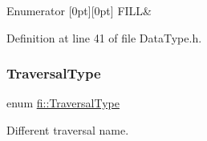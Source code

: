 \begin{DoxyEnumFields}{Enumerator}
[0pt][0pt]{}\mbox{\label{namespacefi_a6808b618c85d179a330ca388162215bdae8225b11842409df543692aebed34fd1}} 
F\+I\+LL&\\
\hline

\end{DoxyEnumFields}


Definition at line 41 of file Data\+Type.\+h.

\mbox{\label{namespacefi_a7ba5ce68668e7f273b22e5f56ca6dfcb}} 
\subsubsection{\texorpdfstring{Traversal\+Type}{TraversalType}}
{\footnotesize\ttfamily enum \hyperlink{namespacefi_a7ba5ce68668e7f273b22e5f56ca6dfcb}{fi\+::\+Traversal\+Type}\hspace{0.3cm}{\ttfamily [strong]}}



Different traversal name. 


